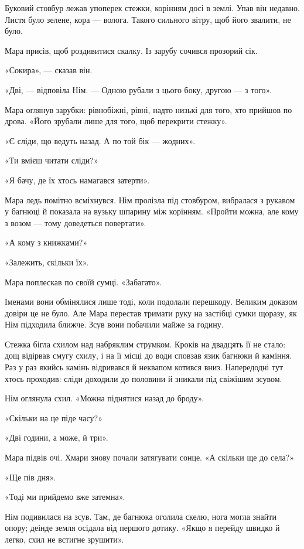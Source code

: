 \documentclass[10pt,a4paper]{article}
\begin{document}
Буковий стовбур лежав упоперек стежки, корінням досі в землі. Упав він недавно. Листя було зелене, кора --- волога. Такого сильного вітру, щоб його звалити, не було.

Мара присів, щоб роздивитися скалку. Із зарубу сочився прозорий сік.

«Сокира», --- сказав він.

«Дві, --- відповіла Нім. --- Одною рубали з цього боку, другою --- з того».

Мара оглянув зарубки: рівнобіжні, рівні, надто низькі для того, хто прийшов по дрова. «Його зрубали лише для того, щоб перекрити стежку».

«Є сліди, що ведуть назад. А по той бік --- жодних».

«Ти вмієш читати сліди?»

«Я бачу, де їх хтось намагався затерти».

Мара ледь помітно всміхнувся. Нім пролізла під стовбуром, вибралася з рукавом у багнюці й показала на вузьку шпарину між корінням. «Пройти можна, але кому з возом --- тому доведеться повертати».

«А кому з книжками?»

«Залежить, скільки їх».

Мара поплескав по своїй сумці. «Забагато».

Іменами вони обмінялися лише тоді, коли подолали перешкоду. Великим доказом довіри це не було. Але Мара перестав тримати руку на застібці сумки щоразу, як Нім підходила ближче.
Зсув вони побачили майже за годину.

Стежка бігла схилом над набряклим струмком. Кроків на двадцять її не стало: дощ відірвав смугу схилу, і на її місці до води сповзав язик багнюки й каміння. Раз у раз якийсь камінь відривався й неквапом котився вниз. Напередодні тут хтось проходив: сліди доходили до половини й зникали під свіжішим зсувом.

Нім оглянула схил. «Можна піднятися назад до броду».

«Скільки на це піде часу?»

«Дві години, а може, й три».

Мара підвів очі. Хмари знову почали затягувати сонце. «А скільки ще до села?»

«Ще пів дня».

«Тоді ми прийдемо вже затемна».

Нім подивилася на зсув. Там, де багнюка оголила скелю, нога могла знайти опору; деінде земля осідала від першого дотику. «Якщо я перейду швидко й легко, схил не встигне зрушити».
\end{document}
